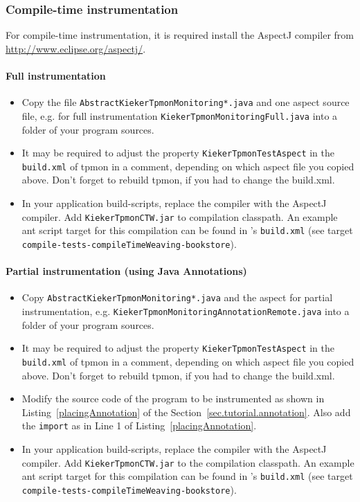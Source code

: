 \documentclass[a4paper,12pt]{scrartcl}
\begin{document}
\subsubsection{Compile-time instrumentation}
For compile-time instrumentation, it is required install the AspectJ compiler from \url{http://www.eclipse.org/aspectj/}.

\paragraph{Full instrumentation}
\begin{itemize}
 \item Copy the file \texttt{\small AbstractKiekerTpmonMonitoring*.java} and one aspect source file, e.g. for full instrumentation \texttt{\small KiekerTpmonMonitoringFull.java} into a folder of your program sources.
\item  It may be required to adjust the property \texttt{\small KiekerTpmonTestAspect} in the \texttt{\small build.xml} of tpmon in a comment, depending on which aspect file you copied above. Don't forget to rebuild tpmon, if you had to change the build.xml.
\item In your application build-scripts, replace the compiler with the AspectJ compiler. Add \texttt{KiekerTpmonCTW.jar} to compilation classpath. An example ant script target for this compilation can be found in \tpmon{}'s \texttt{build.xml} (see target \\ \texttt{compile-tests-compileTimeWeaving-bookstore}).
\end{itemize}

\paragraph{Partial instrumentation (using Java Annotations)}
\begin{itemize}
\item  Copy \texttt{\small AbstractKiekerTpmonMonitoring*.java} and the aspect for partial instrumentation, e.g. \texttt{\small KiekerTpmonMonitoringAnnotationRemote.java} into a folder of your program sources. 
\item It may be required to adjust the property \texttt{\small KiekerTpmonTestAspect} in the \texttt{\small build.xml} of tpmon in a comment, depending on which aspect file you copied above. Don't forget to rebuild tpmon, if you had to change the build.xml.
\item Modify the source code of the program to be instrumented as shown in Listing~\ref{placingAnnotation} of the Section~\ref{sec.tutorial.annotation}. Also add the \texttt{import} as in Line 1 of Listing~\ref{placingAnnotation}.
\item In your application build-scripts, replace the compiler with the AspectJ compiler. Add \texttt{KiekerTpmonCTW.jar} to the compilation classpath. An example ant script target for this compilation can be found in \tpmon{}'s \texttt{build.xml} (see target \\ \texttt{compile-tests-compileTimeWeaving-bookstore}).
\end{itemize}
\end{document}
